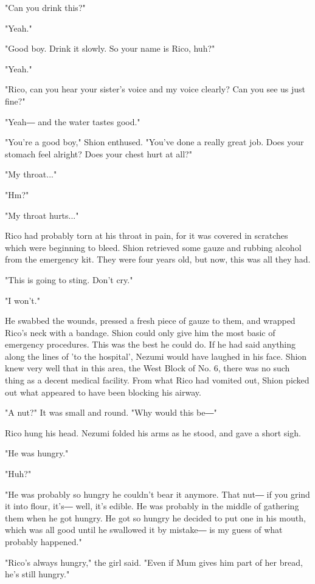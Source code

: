 "Can you drink this?"

"Yeah."

"Good boy. Drink it slowly. So your name is Rico, huh?"

"Yeah."

"Rico, can you hear your sister's voice and my voice clearly? Can you
see us just fine?"

"Yeah― and the water tastes good."

"You're a good boy," Shion enthused. "You've done a really great job.
Does your stomach feel alright? Does your chest hurt at all?"

"My throat..."

"Hm?"

"My throat hurts..."

Rico had probably torn at his throat in pain, for it was covered in
scratches which were beginning to bleed. Shion retrieved some gauze and
rubbing alcohol from the emergency kit. They were four years old, but
now, this was all they had.

"This is going to sting. Don't cry."

"I won't."

He swabbed the wounds, pressed a fresh piece of gauze to them, and
wrapped Rico's neck with a bandage. Shion could only give him the most
basic of emergency procedures. This was the best he could do. If he had
said anything along the lines of 'to the hospital', Nezumi would have
laughed in his face. Shion knew very well that in this area, the West
Block of No. 6, there was no such thing as a decent medical facility.
From what Rico had vomited out, Shion picked out what appeared to have
been blocking his airway.

"A nut?" It was small and round. "Why would this be―"

Rico hung his head. Nezumi folded his arms as he stood, and gave a short
sigh.

"He was hungry."

"Huh?"

"He was probably so hungry he couldn't bear it anymore. That nut― if you
grind it into flour, it's― well, it's edible. He was probably in the
middle of gathering them when he got hungry. He got so hungry he decided
to put one in his mouth, which was all good until he swallowed it by
mistake― is my guess of what probably happened."

"Rico's always hungry," the girl said. "Even if Mum gives him part of
her bread, he's still hungry."

